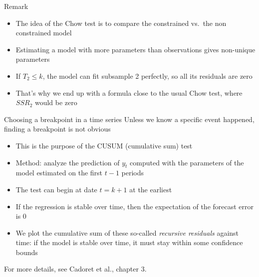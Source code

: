 \documentclass[aspectratio=169]{beamer}
\begin{document}
\begin{frame}{Remark}
\begin{itemize}
    \item The idea of the Chow test is to compare the constrained vs.\ the non constrained model
    \item Estimating a model with more parameters than observations gives non-unique parameters
    \item If $T_2 \leq k$, the model can fit subsample 2 perfectly, so all its residuals are zero
    \item That's why we end up with a formula close to the usual Chow test, where $SSR_2$ would be zero
\end{itemize}
\end{frame}

\begin{frame}{Choosing a breakpoint in a time series}
Unless we know a specific event happened, finding a breakpoint is not obvious

\begin{itemize}
    \item This is the purpose of the CUSUM (cumulative sum) test
    \item Method: analyze the prediction of $y_t$ computed with the parameters of the model estimated on the first $t-1$ periods
    \item The test can begin at date $t = k+1$ at the earliest
    \item If the regression is stable over time, then the expectation of the forecast error is 0
    \item We plot the cumulative sum of these so-called \textit{recursive residuals} against time: if the model is stable over time, it must stay within some confidence bounds
\end{itemize}

For more details, see Cadoret et al., chapter 3.
\end{frame}
\end{document}
